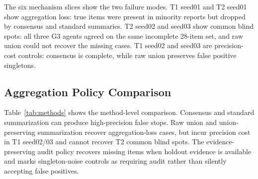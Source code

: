 \documentclass[letterpaper]{article}
\begin{document}
The six mechanism slices show the two failure modes. T1 seed01 and
T2 seed01 show aggregation loss: true items were present in minority reports but
dropped by consensus and standard summaries. T2 seed02 and seed03 show common
blind spots: all three G3 agents agreed on the same incomplete 28-item set, and
raw union could not recover the missing cases. T1 seed02 and seed03 are
precision-cost controls: consensus is complete, while raw union preserves false
positive singletons.

\subsection{Aggregation Policy Comparison}

Table~\ref{tab:methods} shows the method-level comparison. Consensus and
standard summarization can produce high-precision false stops. Raw union and
union-preserving summarization recover aggregation-loss cases, but incur
precision cost in T1 seed02/03 and cannot recover T2 common blind spots. The
evidence-preserving audit policy recovers missing items when holdout evidence is
available and marks singleton-noise controls as requiring audit rather than
silently accepting false positives.
\end{document}
